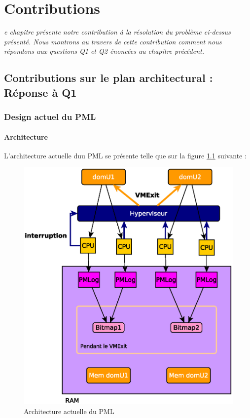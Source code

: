 \let\textcircled=\pgftextcircled
\chapter{Contributions}
\label{chap:contrib}

\textit{e chapitre présente notre contribution à la résolution du problème ci-dessus présenté. Nous montrons au travers de cette contribution comment nous répondons aux questions Q1 et Q2 énoncées au chapitre précédent.}

\minitoc

\newpage  
\section{Contributions sur le plan architectural : Réponse à Q1}

\subsection{Design actuel du PML}

\subsubsection{Architecture}
L'architecture actuelle duu PML se présente telle que sur la figure \ref{fig:pml_actuel} suivante :
\begin{figure}[H]
    \centering
    \includegraphics[scale=.8]{chapters/3/fig3/PMLactual3}
    \caption{Architecture actuelle du PML}
    \label{fig:pml_actuel}
\end{figure}

